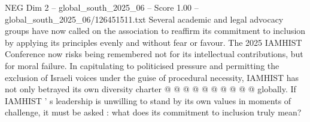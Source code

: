 \begin{textsample}{NEG Dim 2 – global\_south\_2025\_06 – Score 1.00 – global\_south\_2025\_06/126451511.txt}
Several academic and legal advocacy groups have now called on the association to reaffirm its commitment to inclusion by applying its principles evenly and without fear or favour.
The 2025 IAMHIST Conference now risks being remembered not for its intellectual contributions, but for moral failure.
In capitulating to politicised pressure and permitting the exclusion of Israeli voices under the guise of procedural necessity, IAMHIST has not only betrayed its own diversity charter @ @ @ @ @ @ @ @ @ @ globally.
If IAMHIST ' s leadership is unwilling to stand by its own values in moments of challenge, it must be asked : what does its commitment to inclusion truly mean?

\end{textsample}
